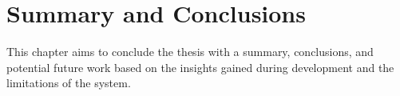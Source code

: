 \chapter{Summary and Conclusions}
\label{chap:summary}
This chapter aims to conclude the thesis with a summary, conclusions, and potential future work based on the insights gained during development and the limitations of the system.


